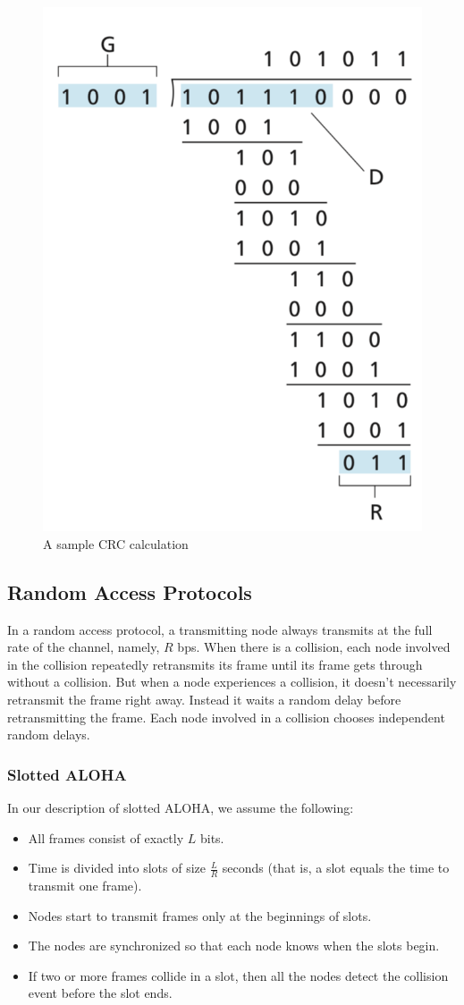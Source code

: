 \documentclass[11pt]{article}
\begin{document}
\begin{figure}[h]
	\centering
	\includegraphics[width=0.5\linewidth]{images/CRCC.png}
	\caption{A sample CRC calculation}
	\label{fig:CRCC}
\end{figure}

\subsection{Random Access Protocols}

In a random access protocol, a transmitting node always transmits at the full rate of the channel, namely, $R$ bps. When there is a collision, each node involved in the collision repeatedly retransmits its frame until its frame gets through without a collision. But when a node experiences a collision, it doesn’t necessarily retransmit the frame right away. Instead it waits a random delay before retransmitting the frame. Each node involved in a collision chooses independent random delays. 

\subsubsection{Slotted ALOHA}

In our description of slotted ALOHA, we assume the following:

\begin{itemize}
	\item All frames consist of exactly $L$ bits.
	
	\item Time is divided into slots of size $\frac{L}{R}$ seconds (that is, a slot equals the time to transmit one frame).
	
	\item Nodes start to transmit frames only at the beginnings of slots.
	
	\item The nodes are synchronized so that each node knows when the slots begin.
	
	\item If two or more frames collide in a slot, then all the nodes detect the collision event before the slot ends.
\end{itemize}
\end{document}
